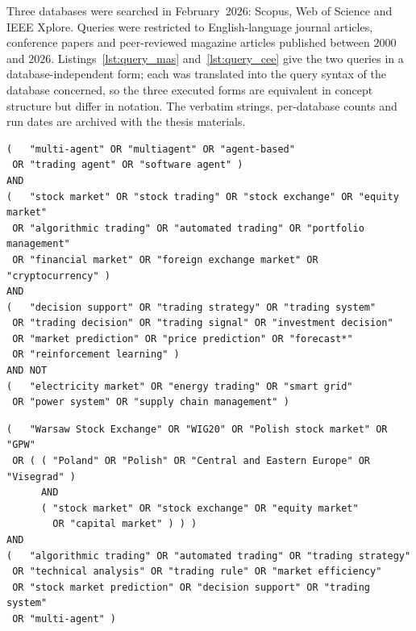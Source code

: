 Three databases were searched in February~2026: Scopus, Web of Science and IEEE Xplore. Queries were restricted to English-language journal articles, conference papers and peer-reviewed magazine articles published between $2000$ and $2026$. Listings~\ref{lst:query_mas} and~\ref{lst:query_cee} give the two queries in a database-independent form; each was translated into the query syntax of the database concerned, so the three executed forms are equivalent in concept structure but differ in notation. The verbatim strings, per-database counts and run dates are archived with the thesis materials.

\begin{listing}[!htbp]
\begin{verbatim}
(   "multi-agent" OR "multiagent" OR "agent-based"
 OR "trading agent" OR "software agent" )
AND
(   "stock market" OR "stock trading" OR "stock exchange" OR "equity market"
 OR "algorithmic trading" OR "automated trading" OR "portfolio management"
 OR "financial market" OR "foreign exchange market" OR "cryptocurrency" )
AND
(   "decision support" OR "trading strategy" OR "trading system"
 OR "trading decision" OR "trading signal" OR "investment decision"
 OR "market prediction" OR "price prediction" OR "forecast*"
 OR "reinforcement learning" )
AND NOT
(   "electricity market" OR "energy trading" OR "smart grid"
 OR "power system" OR "supply chain management" )
\end{verbatim}
\caption{Query for RQ1, in database-independent form. The three concept blocks are architecture, financial domain and function; the negation block removes the energy-trading literature, in which \emph{multi-agent trading} is a common term for a different subject.}
\label{lst:query_mas}
\end{listing}

\begin{listing}[!htbp]
\begin{verbatim}
(   "Warsaw Stock Exchange" OR "WIG20" OR "Polish stock market" OR "GPW"
 OR ( ( "Poland" OR "Polish" OR "Central and Eastern Europe" OR "Visegrad" )
      AND
      ( "stock market" OR "stock exchange" OR "equity market"
        OR "capital market" ) ) )
AND
(   "algorithmic trading" OR "automated trading" OR "trading strategy"
 OR "technical analysis" OR "trading rule" OR "market efficiency"
 OR "stock market prediction" OR "decision support" OR "trading system"
 OR "multi-agent" )
\end{verbatim}
\caption{Query for RQ2, in database-independent form. The specific venue terms match on their own, while the generic country and region terms must co-occur with an equity-market term; without that restriction the query returned a large volume of country-level macroeconomic work.}
\label{lst:query_cee}
\end{listing}

